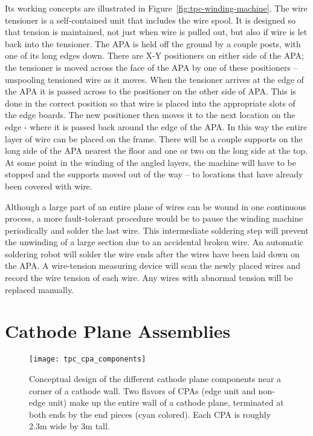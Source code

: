 Its working concepts are illustrated in Figure~\ref{fig:tpc-winding-machine}. 
The wire tensioner is a self-contained unit that includes the wire spool.  It is designed so that tension is maintained, not just when wire is pulled out, but also if wire is let back into the tensioner.  The APA is held off the ground by a couple posts, with one of its long edges down.  There are X-Y positioners on either side of the APA; the tensioner is moved across the face of the APA by one of these positioners – unspooling tensioned wire as it moves.  When the tensioner arrives at the edge of the APA it is passed across to the positioner on the other side of APA.  This is done in the correct position so that wire is placed into the appropriate slots of the edge boards. The new positioner then moves it to the next location on the edge - where it is passed back around the edge of the APA.  In this way the entire layer of wire can be placed on the frame.  There will be a couple supports on the long side of the APA nearest the floor and one or two on the long side at the top.  At some point in the winding of the angled layers, the machine will have to be stopped and the supports moved out of the way -- to locations that have already been covered with wire.

Although a large part of an entire plane of wires can be wound in one continuous process, a more fault-tolerant procedure would be to pause the winding machine periodically and solder the last wire. This intermediate soldering step will prevent the unwinding of a large section due to an accidental broken wire.  An automatic soldering robot will solder the wire ends after the wires have been laid down on the APA. A wire-tension measuring device will scan the newly placed wires and record the wire tension of each wire. Any wires with abnormal tension will be replaced manually.



\section{Cathode Plane Assemblies}
\label{subsec:v5-tpc-chamber-cathode}

\begin{figure}[t]
\centering
\texttt{[image: tpc\_cpa\_components]}
\caption[Conceptual design of the cathode plane assembly]{Conceptual design of the different cathode plane components near a corner of a cathode wall.  Two flavors of CPAs (edge unit and non-edge unit) make up the entire wall of a cathode plane, terminated at both ends by the end pieces (cyan colored).  Each CPA is roughly 2.3m wide by 3m tall. }
\label{fig:tpc-cathode-model}
\end{figure}


